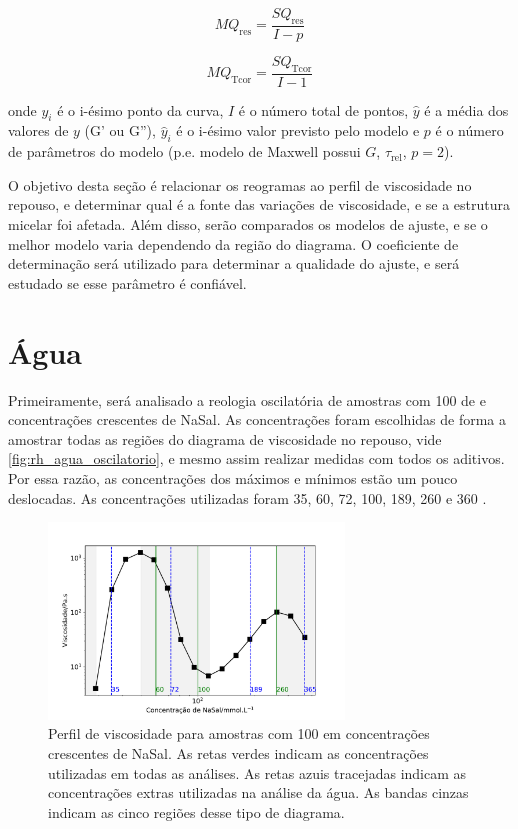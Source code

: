 		\begin{equation}
			MQ_\mathrm{res} = \dfrac{SQ_\mathrm{res}}{I-p}
			\label{eqn:MQres}
		\end{equation}
		
		\begin{equation}
			MQ_\mathrm{Tcor} = \dfrac{SQ_\mathrm{Tcor}}{I - 1}
			\label{eqn:MQTcor}
		\end{equation}
		
		\noindent onde \(y_i\) é o i-ésimo ponto da curva, \(I\) é o número total de pontos, \(\hat{y}\) é a média dos valores de \(y\) (G' ou G''), \(\hat{y}_i\) é o i-ésimo valor previsto pelo modelo e \(p\) é o número de parâmetros do modelo (p.e. modelo de Maxwell possui \(G\), \(\tau_\mathrm{rel}\), \(p=2\)).
		
		O objetivo desta seção é relacionar os reogramas ao perfil de viscosidade no repouso, e determinar qual é a fonte das variações de viscosidade, e se a estrutura micelar foi afetada. Além disso, serão comparados os modelos de ajuste, e se o melhor modelo varia dependendo da região do diagrama. O coeficiente de determinação será utilizado para determinar a qualidade do ajuste, e será estudado se esse parâmetro é confiável.
		
		\section{Água}
		\label{sec:reologia_oscilatoria_experimental_agua}
		Primeiramente, será analisado a reologia oscilatória de amostras com 100 \mM{} de \CTAB{} e concentrações crescentes de NaSal. As concentrações foram escolhidas de forma a amostrar todas as regiões do diagrama de viscosidade no repouso, vide \autoref{fig:rh_agua_oscilatorio}, e mesmo assim realizar medidas com todos os aditivos. Por essa razão, as concentrações dos máximos e mínimos estão um pouco deslocadas. As concentrações utilizadas foram 35, 60, 72, 100, 189, 260 e 360 \mM.

		\begin{figure}[h]
			\centering
			\includegraphics[width=0.7\textwidth]{imagens/reologia/RH_agua_oscilatorio}
			\caption{Perfil de viscosidade para amostras com \CTAB{} 100 \mM{} em concentrações crescentes de NaSal. As retas verdes indicam as concentrações utilizadas em todas as análises. As retas azuis tracejadas indicam as concentrações extras utilizadas na análise da água. As bandas cinzas indicam as cinco regiões desse tipo de diagrama.}
			\label{fig:rh_agua_oscilatorio}
		\end{figure}
		
